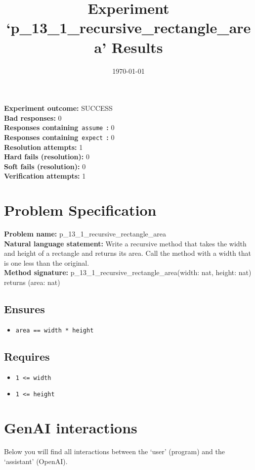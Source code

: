 \documentclass{article}
\begin{document}
\title{Experiment `p\_13\_1\_recursive\_rectangle\_area' Results}
\author{\today}
\date{}
\maketitle
\textbf{Experiment outcome: }SUCCESS
\\\textbf{Bad responses: }0
\\\textbf{Responses containing}~\texttt{assume}~\textbf{: }0
\\\textbf{Responses containing}~\texttt{expect}~\textbf{: }0
\\\textbf{Resolution attempts: }1
\\\textbf{Hard fails (resolution): }0
\\\textbf{Soft fails (resolution): }0
\\\textbf{Verification attempts: }1
\section*{Problem Specification}
\textbf{Problem name: }p\_13\_1\_recursive\_rectangle\_area
\\\textbf{Natural language statement: }Write a recursive method that takes the width and height of a rectangle and returns its area. Call the method with a width that is one less than the original.
\\\textbf{Method signature: }p\_13\_1\_recursive\_rectangle\_area(width: nat, height: nat) returns (area: nat)
\subsection*{Ensures}
\begin{itemize}
\item \texttt{area == width * height}
\end{itemize}
\subsection*{Requires}
\begin{itemize}
\item \texttt{1 <= width}
\item \texttt{1 <= height}
\end{itemize}
\clearpage
\section*{GenAI interactions}
Below you will find all interactions between the `user' (program) and the `assistant' (OpenAI).
\end{document}
